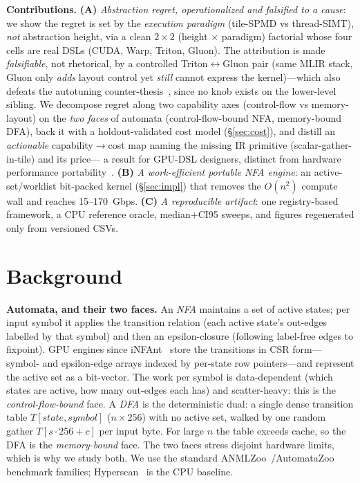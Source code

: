 \documentclass[conference]{IEEEtran}
\begin{document}
\textbf{Contributions.}
\textbf{(A)} \emph{Abstraction regret, operationalized and falsified to a cause}: we show the
regret is set by the \emph{execution paradigm} (tile-SPMD vs thread-SIMT), \emph{not}
abstraction height, via a clean $2\times2$ (height $\times$ paradigm) factorial whose four
cells are real DSLs (CUDA, Warp, Triton, Gluon). The attribution is made \emph{falsifiable},
not rhetorical, by a controlled Triton$\leftrightarrow$Gluon pair (same MLIR stack, Gluon only
\emph{adds} layout control yet \emph{still} cannot express the kernel)---which also defeats the
autotuning counter-thesis~\cite{autotuning}, since no knob exists on the lower-level sibling.
We decompose regret along two capability axes (control-flow vs memory-layout) on the
\emph{two faces} of automata (control-flow-bound NFA, memory-bound DFA), back it with a
holdout-validated cost model (\S\ref{sec:cost}), and distill an \emph{actionable}
capability$\to$cost map naming the missing IR primitive (scalar-gather-in-tile) and its price---
a result for GPU-DSL designers, distinct from hardware performance portability~\cite{pennycook}.
\textbf{(B)} \emph{A work-efficient portable NFA engine}: an active-set/worklist
bit-packed kernel (\S\ref{sec:impl}) that removes the $O(n^2)$ compute wall and reaches
15--170~Gbps. \textbf{(C)} \emph{A reproducible artifact}: one registry-based framework,
a CPU reference oracle, median+CI95 sweeps, and figures regenerated only from versioned
CSVs.

\section{Background}
\textbf{Automata, and their two faces.} An \emph{NFA} maintains a set of active states; per
input symbol it applies the transition relation (each active state's out-edges labelled by that
symbol) and then an epsilon-closure (following label-free edges to fixpoint). GPU engines since
iNFAnt~\cite{infant} store the transitions in CSR form---symbol- and epsilon-edge arrays indexed
by per-state row pointers---and represent the active set as a bit-vector. The work per symbol is
data-dependent (which states are active, how many out-edges each has) and scatter-heavy: this is
the \emph{control-flow-bound} face. A \emph{DFA} is the deterministic dual: a single dense
transition table $T[\textit{state},\textit{symbol}]$ ($n\times256$) with no active set, walked by
one random gather $T[s\!\cdot\!256+c]$ per input byte. For large $n$ the table exceeds cache, so
the DFA is the \emph{memory-bound} face. The two faces stress disjoint hardware limits, which is
why we study both. We use the standard ANMLZoo~\cite{anmlzoo}/AutomataZoo benchmark families;
Hyperscan~\cite{hyperscan} is the CPU baseline.
\end{document}
